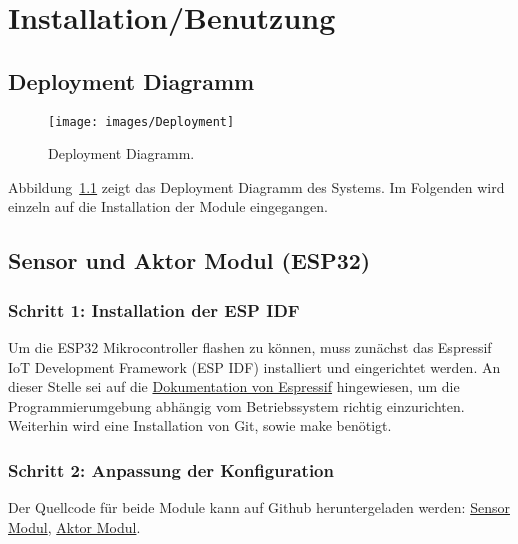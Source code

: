 \chapter{Installation/Benutzung}
\label{cha:Installation/Benutzung}

\section{Deployment Diagramm}

\begin{figure}[hbt]
	\centering
	\texttt{[image: images/Deployment]}
	\caption[Deployment Diagramm]{Deployment Diagramm.}
	\label{fig:deployment_diagramm}
\end{figure}

Abbildung~\ref{fig:deployment_diagramm} zeigt das Deployment Diagramm des Systems. Im Folgenden wird einzeln auf die Installation der Module eingegangen.

\section{Sensor und Aktor Modul (ESP32)}
\label{cha:Installation_IDF}
\subsection{Schritt 1: Installation der ESP IDF}
Um die ESP32 Mikrocontroller flashen zu können, muss zunächst das Espressif IoT Development Framework (ESP IDF) installiert und eingerichtet werden. An dieser Stelle sei auf die \href{https://docs.espressif.com/projects/esp-idf/en/latest/index.html}{Dokumentation von Espressif} hingewiesen, um die Programmierumgebung abhängig vom Betriebssystem richtig einzurichten. Weiterhin wird eine Installation von Git, sowie make benötigt.

\subsection{Schritt 2: Anpassung der Konfiguration}
Der Quellcode für beide Module kann auf Github heruntergeladen werden: \href{https://github.com/maxbachmann-university/esp32-sensor-modul}{Sensor Modul}, \href{https://github.com/maxbachmann-university/esp32-actuator-module}{Aktor Modul}.

